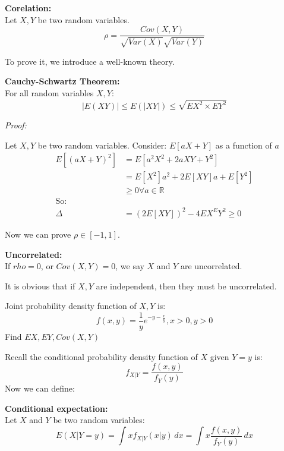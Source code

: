 \documentclass{article}
\begin{document}
\begin{definition}
    \textbf{Corelation:}\\
    Let $X,Y$ be two random variables.
    \begin{equation*}
        \rho = \frac{Cov(X,Y)}{\sqrt{Var(X)}\sqrt{Var(Y)}}
    \end{equation*}
\end{definition}
To prove it, we introduce a well-known theory.
\begin{theorem}
    \textbf{Cauchy-Schwartz Theorem:}\\
    For all random variables $X,Y$:
    \begin{equation*}
        |E(XY)| \leq E(|XY|) \leq \sqrt{EX^2 \times EY^2}
    \end{equation*}
\end{theorem}
\emph{Proof:}

Let $X,Y$ be two random variables. Consider: $E[aX+Y]$ as a function of $a$
\begin{align*}
    E[(aX+Y)^2] &= E[a^2X^2 + 2aXY + Y^2] \\
                &= E[X^2] a^2 + 2E[XY] a + E[Y^2] \\
                &\geq 0 \forall a \in \mathbb{R} \\
            \text{So:}& \\
            \Delta &= (2E[XY])^2 - 4EX^EY^2 \geq 0
\end{align*}

Now we can prove $\rho \in [-1,1]$.

\begin{definition}
    \textbf{Uncorrelated:}\\
    If $rho = 0$, or $Cov(X,Y) = 0$, we say $X$ and $Y$ are uncorrelated.
\end{definition}
It is obvious that if $X, Y$ are independent, then they must be uncorrelated.

\begin{quiz}
    Joint probability density function of $X,Y$ is:
    \begin{equation*}
        f(x,y) = \frac{1}{y} e^{-y-\frac{x}{y}}, x>0,y>0
    \end{equation*}
    Find $EX,EY,Cov(X,Y)$
\end{quiz}

Recall the conditional probability density function of $X$ given $Y = y$ is:
\begin{equation*}
    f_{X|Y} = \frac{f(x,y)}{f_Y(y)}
\end{equation*}
Now we can define:
\begin{definition}
    \textbf{Conditional expectation:}\\
    Let $X$ and $Y$ be two random variables:
    \begin{equation*}
        E(X|Y=y) = \int xf_{X|Y}(x|y) \, dx = \int x \frac{f(x,y)}{f_Y(y)} \, dx
    \end{equation*}
\end{definition}
\end{document}
